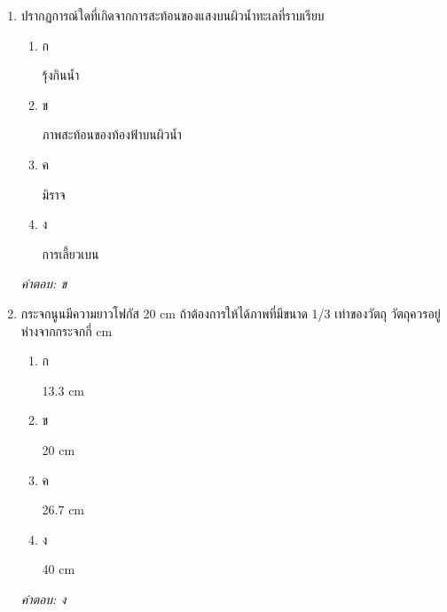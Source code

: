 \documentclass[12pt]{article}
\begin{document}
\begin{enumerate}[label=\arabic*., itemsep=0.5\baselineskip, topsep=0.5\baselineskip, leftmargin=*]
\item ปรากฏการณ์ใดที่เกิดจากการสะท้อนของแสงบนผิวน้ำทะเลที่ราบเรียบ
\begin{enumerate}[label=\alph*)., itemsep=0.3\baselineskip, topsep=0.3\baselineskip]
\item ก\ 
\begin{minipage}[t]{0.9\linewidth}
\raggedright รุ้งกินน้ำ
\end{minipage}
\item ข\ 
\begin{minipage}[t]{0.9\linewidth}
\raggedright ภาพสะท้อนของท้องฟ้าบนผิวน้ำ
\end{minipage}
\item ค\ 
\begin{minipage}[t]{0.9\linewidth}
\raggedright มิราจ
\end{minipage}
\item ง\ 
\begin{minipage}[t]{0.9\linewidth}
\raggedright การเลี้ยวเบน
\end{minipage}
\end{enumerate}
\vspace{-0.3\baselineskip}
\begin{small}
\textit{คำตอบ: ข}
\end{small}

\item กระจกนูนมีความยาวโฟกัส 20 cm ถ้าต้องการให้ได้ภาพที่มีขนาด 1/3 เท่าของวัตถุ วัตถุควรอยู่ห่างจากกระจกกี่ cm
\begin{enumerate}[label=\alph*)., itemsep=0.3\baselineskip, topsep=0.3\baselineskip]
\item ก\ 
\begin{minipage}[t]{0.9\linewidth}
\raggedright 13.3 cm
\end{minipage}
\item ข\ 
\begin{minipage}[t]{0.9\linewidth}
\raggedright 20 cm
\end{minipage}
\item ค\ 
\begin{minipage}[t]{0.9\linewidth}
\raggedright 26.7 cm
\end{minipage}
\item ง\ 
\begin{minipage}[t]{0.9\linewidth}
\raggedright 40 cm
\end{minipage}
\end{enumerate}
\vspace{-0.3\baselineskip}
\begin{small}
\textit{คำตอบ: ง}
\end{small}


\end{enumerate}
\end{document}
